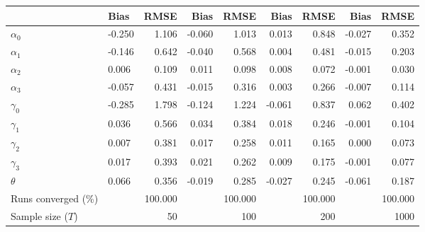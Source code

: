 
\begin{tabular}[t]{llrrrrrrr}
\toprule
  & Bias & RMSE & Bias & RMSE & Bias & RMSE & Bias & RMSE\\
\midrule
$\alpha_{0}$ & -0.250 & 1.106 & -0.060 & 1.013 & 0.013 & 0.848 & -0.027 & 0.352\\
$\alpha_{1}$ & -0.146 & 0.642 & -0.040 & 0.568 & 0.004 & 0.481 & -0.015 & 0.203\\
$\alpha_{2}$ & 0.006 & 0.109 & 0.011 & 0.098 & 0.008 & 0.072 & -0.001 & 0.030\\
$\alpha_{3}$ & -0.057 & 0.431 & -0.015 & 0.316 & 0.003 & 0.266 & -0.007 & 0.114\\
$\gamma_{0}$ & -0.285 & 1.798 & -0.124 & 1.224 & -0.061 & 0.837 & 0.062 & 0.402\\
$\gamma_{1}$ & 0.036 & 0.566 & 0.034 & 0.384 & 0.018 & 0.246 & -0.001 & 0.104\\
$\gamma_{2}$ & 0.007 & 0.381 & 0.017 & 0.258 & 0.011 & 0.165 & 0.000 & 0.073\\
$\gamma_{3}$ & 0.017 & 0.393 & 0.021 & 0.262 & 0.009 & 0.175 & -0.001 & 0.077\\
$\theta$ & 0.066 & 0.356 & -0.019 & 0.285 & -0.027 & 0.245 & -0.061 & 0.187\\
Runs converged (\%) &  & 100.000 &  & 100.000 &  & 100.000 &  & 100.000\\
Sample size ($T$) &  & 50 &  & 100 &  & 200 &  & 1000\\
\bottomrule
\end{tabular}
